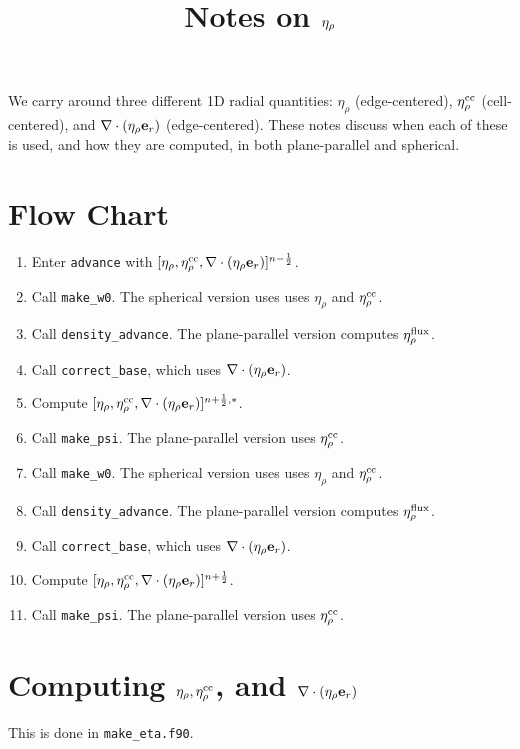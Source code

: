 \documentclass[11pt]{article}
\title{Notes on $\etarho$}
\def\half   {\frac{1}{2}}
\def\eb         {{\bf e}}
\def\etarho     {\eta_\rho}
\def\etarhocc   {\etarho^{\rm cc}}
\def\etarhoflux {\etarho^{\rm flux}}
\def\divetarho  {\nabla\cdot(\etarho\eb_r)}
\begin{document}
\maketitle
\tableofcontents
\clearpage

We carry around three different 1D radial quantities: $\etarho$ (edge-centered), $\etarhocc$ (cell-centered), and $\divetarho$ (edge-centered).  These notes discuss when each of these is used, and how they are computed, in both plane-parallel and spherical.

\section{Flow Chart}
\begin{enumerate}
\item Enter {\tt advance} with $[\etarho, \etarhocc, \divetarho]^{n-\half}$.
\item Call {\tt make\_w0}.  The spherical version uses uses $\etarho$ and $\etarhocc$.
\item Call {\tt density\_advance}.  The plane-parallel version computes $\etarhoflux$.
\item Call {\tt correct\_base}, which uses $\divetarho$.
\item Compute $[\etarho, \etarhocc, \divetarho]^{n+\half,*}$.
\item Call {\tt make\_psi}.  The plane-parallel version uses $\etarhocc$.
\item Call {\tt make\_w0}.  The spherical version uses uses $\etarho$ and $\etarhocc$.
\item Call {\tt density\_advance}.  The plane-parallel version computes $\etarhoflux$.
\item Call {\tt correct\_base}, which uses $\divetarho$.
\item Compute $[\etarho, \etarhocc, \divetarho]^{n+\half}$.
\item Call {\tt make\_psi}.  The plane-parallel version uses $\etarhocc$.
\end{enumerate}

\section{Computing $\etarho, \etarhocc$, and $\divetarho$}
This is done in {\tt make\_eta.f90}.
\end{document}
